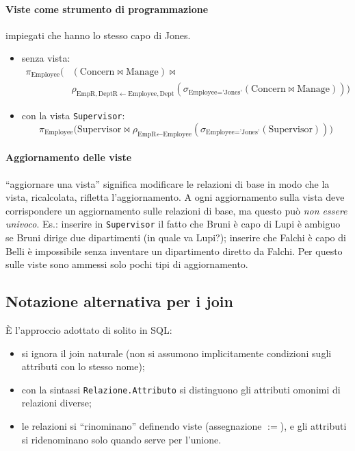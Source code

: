 \documentclass[a4paper,12pt]{article}
\begin{document}
\paragraph{Viste come strumento di programmazione} impiegati che hanno lo
stesso capo di Jones.
\begin{itemize}
  \item senza vista:
    \begin{align*}
      \pi_{\text{Employee}}\bigl(
      & (\text{Concern} \bowtie \text{Manage}) \bowtie{}\\
      & \rho_{\text{EmpR},\text{DeptR} \leftarrow \text{Employee},\text{Dept}}
        (\sigma_{\text{Employee} = \text{'Jones'}}
        (\text{Concern} \bowtie \text{Manage}))\bigr)
    \end{align*}
  \item con la vista \texttt{Supervisor}:
    \[ \pi_{\text{Employee}}\bigl(\text{Supervisor} \bowtie
       \rho_{\text{EmpR} \leftarrow \text{Employee}}
       (\sigma_{\text{Employee} = \text{'Jones'}}(\text{Supervisor}))\bigr) \]
\end{itemize}

\paragraph{Aggiornamento delle viste} ``aggiornare una vista'' significa
modificare le relazioni di base in modo che la vista, ricalcolata, rifletta
l'aggiornamento. A ogni aggiornamento sulla vista deve corrispondere un
aggiornamento sulle relazioni di base, ma questo può \emph{non essere univoco}.
Es.: inserire in \texttt{Supervisor} il fatto che Bruni è capo di Lupi è
ambiguo se Bruni dirige due dipartimenti (in quale va Lupi?); inserire che
Falchi è capo di Belli è impossibile senza inventare un dipartimento diretto
da Falchi. Per questo sulle viste sono ammessi solo pochi tipi di
aggiornamento.

\subsection{Notazione alternativa per i join}

È l'approccio adottato di solito in SQL:
\begin{itemize}
  \item si ignora il join naturale (non si assumono implicitamente condizioni
    sugli attributi con lo stesso nome);
  \item con la sintassi \texttt{Relazione.Attributo} si distinguono gli
    attributi omonimi di relazioni diverse;
  \item le relazioni si ``rinominano'' definendo viste (assegnazione
    $:=$), e gli attributi si ridenominano solo quando serve per l'unione.
\end{itemize}
\end{document}
